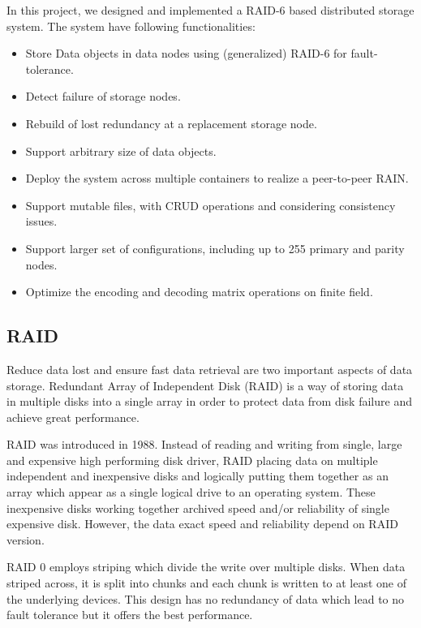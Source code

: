 \documentclass[conference]{IEEEtran}
\begin{document}
In this project, we designed and implemented a RAID-6 based distributed storage system. The system have following functionalities:

\begin{itemize}
    \item Store Data objects in data nodes using (generalized) RAID-6 for fault-tolerance.
    \item Detect failure of storage nodes.
    \item Rebuild of lost redundancy at a replacement storage node.
    \item Support arbitrary size of data objects.
    \item Deploy the system across multiple containers to realize a peer-to-peer RAIN.
    \item Support mutable files, with CRUD operations and considering consistency issues.
    \item Support larger set of configurations, including up to 255 primary and parity nodes.
    \item Optimize the encoding and decoding matrix operations on finite field.
\end{itemize}

\subsection{RAID}

Reduce data lost and ensure fast data retrieval are two important aspects of data storage. Redundant Array of Independent Disk (RAID) is a way of storing data in multiple disks into a single array in order to protect data from disk failure and achieve great performance. 

RAID was introduced in 1988\cite{patterson1988case}. Instead of reading and writing from single, large and expensive high performing disk driver, RAID placing data on multiple independent and inexpensive disks and logically putting them together as an array which appear as a single logical drive to an operating system. These inexpensive disks working together archived speed and/or reliability of single expensive disk. However, the data exact speed and reliability depend on RAID version. 

RAID 0 employs striping which divide the write over multiple disks. When data striped across, it is split into chunks and each chunk is written to at least one of the underlying devices. This design has no redundancy of data which lead to no fault tolerance but it offers the best performance. 
\end{document}
